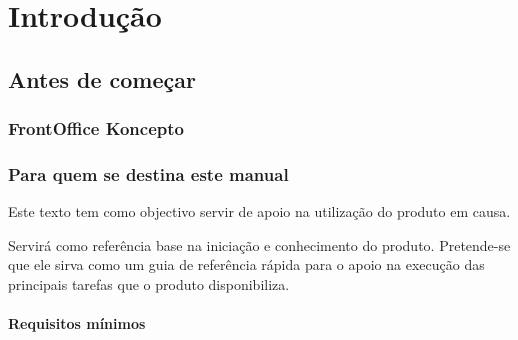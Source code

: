 \documentclass[a4paper,11pt,openany]{memoir}
\begin{document}
\cleardoublepage

\pagestyle{headings}
















\tableofcontents


\mainmatter


\newpage
\part{Introdução}

\chapter{Antes de começar}

\section{FrontOffice Koncepto}     %
%

\section{Para quem se destina este manual}

Este texto tem como objectivo servir de apoio na utilização do produto em causa.

Servirá como referência base na iniciação e conhecimento do produto. Pretende-se
que ele sirva como um guia de referência rápida para o apoio na execução das
principais tarefas que o produto disponibiliza.



\subsection{Requisitos mínimos}
\end{document}
